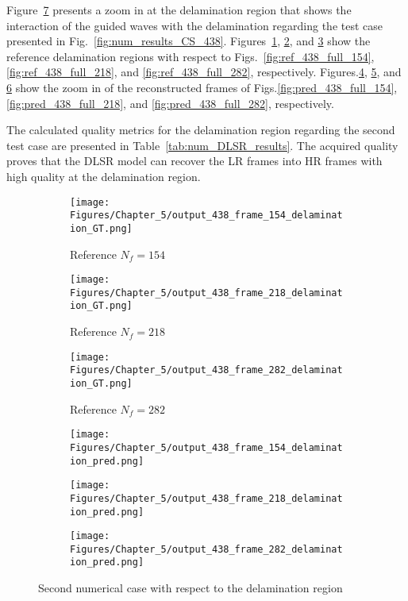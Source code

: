 Figure~\ref{fig:num_results_CS_damage_area_438} presents a zoom in at the delamination region that shows the interaction of the guided waves with the delamination regarding the test case presented in Fig.~\ref{fig:num_results_CS_438}.
Figures~\ref{fig:ref_438_damage_154}, \ref{fig:ref_438_damage_218}, and \ref{fig:ref_438_damage_282} show the reference delamination regions with respect to Figs.~\ref{fig:ref_438_full_154}, \ref{fig:ref_438_full_218}, and \ref{fig:ref_438_full_282}, respectively.
Figures.\ref{fig:pred_438_damage_154}, \ref{fig:pred_438_damage_218}, and \ref{fig:pred_438_damage_282} show the zoom in of the reconstructed frames of Figs.\ref{fig:pred_438_full_154}, \ref{fig:pred_438_full_218}, and \ref{fig:pred_438_full_282}, respectively.

The calculated quality metrics for the delamination region regarding the second test case are presented in Table~\ref{tab:num_DLSR_results}.
The acquired quality proves that the DLSR model can recover the LR frames into HR frames with high quality at the delamination region.
\begin{figure} [!ht]
	\centering
	\begin{subfigure}[b]{.32\textwidth}
		\centering
		\texttt{[image: Figures/Chapter\_5/output\_438\_frame\_154\_delamination\_GT.png]}
		\caption{Reference $N_f=154$}
		\label{fig:ref_438_damage_154}
	\end{subfigure}
	\begin{subfigure}[b]{.32\textwidth}
		\centering
		\texttt{[image: Figures/Chapter\_5/output\_438\_frame\_218\_delamination\_GT.png]}
		\caption{Reference $N_f=218$}
		\label{fig:ref_438_damage_218}
	\end{subfigure}
	\begin{subfigure}[b]{.32\textwidth}
		\centering
		\texttt{[image: Figures/Chapter\_5/output\_438\_frame\_282\_delamination\_GT.png]}
		\caption{Reference $N_f=282$}
		\label{fig:ref_438_damage_282}	
	\end{subfigure}
	\begin{subfigure}[b]{.32\textwidth}
		\centering
		\texttt{[image: Figures/Chapter\_5/output\_438\_frame\_154\_delamination\_pred.png]}
		\caption{}
		\label{fig:pred_438_damage_154}
	\end{subfigure}
	\begin{subfigure}[b]{.32\textwidth}
		\centering
		\texttt{[image: Figures/Chapter\_5/output\_438\_frame\_218\_delamination\_pred.png]}
		\caption{}
		\label{fig:pred_438_damage_218}
	\end{subfigure}
	\begin{subfigure}[b]{.32\textwidth}
		\centering
		\texttt{[image: Figures/Chapter\_5/output\_438\_frame\_282\_delamination\_pred.png]}
		\caption{}
		\label{fig:pred_438_damage_282}	
	\end{subfigure}
	\caption{Second numerical case with respect to the delamination region}
	\label{fig:num_results_CS_damage_area_438}
\end{figure}



